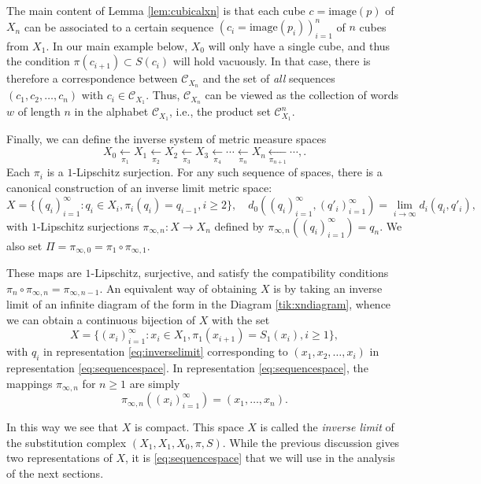 \documentclass{amsart}
\theoremstyle{plain}
\theoremstyle{definition}
\numberwithin{equation}{section}
\numberwithin{theorem}{section}
\newcommand{\cC}{\mathcal{C}}
\begin{document}
The main content of Lemma \ref{lem:cubicalxn} is that each cube $c=\text{image}(p)$ of $X_n$ can be associated to a certain sequence $(c_i=\text{image}(p_i))_{i=1}^n$ of  $n$ cubes from $X_1$. In our main example below, $X_0$ will only have a single cube, and thus the condition $\pi(c_{i+1})\subset S(c_i)$ will hold vacuously. In that case, there is therefore a correspondence between  $\cC_{X_n}$ and the set of \emph{all} sequences $(c_1,c_2,\dots, c_n)$ with $c_i\in \cC_{X_1}$. Thus, $\cC_{X_n}$ can be viewed as the collection of words $w$ of length $n$ in the alphabet $\cC_{X_1}$, i.e., the product set $\cC_{X_1}^n$. 

Finally, we can  define the inverse system of metric measure spaces
\[
X_0 \xleftarrow[\pi_1]{} X_1 \xleftarrow[\pi_2]{} X_2 \xleftarrow[\pi_3]{} X_3 \xleftarrow[\pi_4]{} \cdots \xleftarrow[\pi_n]{} X_n \xleftarrow[\pi_{n+1}]{} \cdots,
.\]
Each $\pi_i$ is a $1$-Lipschitz surjection. For any such sequence of spaces, there is a canonical construction of an inverse limit metric space:
\begin{equation}\label{eq:inverselimit}
X = \{(q_i)_{i=1}^\infty : q_i\in X_i, \pi_i(q_i)=q_{i-1}, i\geq 2\}, \quad d_0((q_i)_{i=1}^\infty,  (q'_i)_{i=1}^\infty)=\lim_{i\to\infty} d_i(q_i,q'_i),
\end{equation}
with $1$-Lipschitz surjections $\pi_{\infty,n}:X\to X_n$ defined by  $\pi_{\infty,n}((q_i)_{i=1}^\infty)=q_n$. We also set $\Pi = \pi_{\infty,0} = \pi_1 \circ \pi_{\infty, 1}.$


These maps are $1$-Lipschitz, surjective, and satisfy the compatibility conditions $\pi_{n} \circ \pi_{\infty,n}=\pi_{\infty,n-1}$. An equivalent way of obtaining $X$ is by taking an inverse limit of an infinite diagram of the form in the Diagram \ref{tik:xndiagram}, whence we can obtain a continuous bijection of $X$ with the set
\begin{equation}\label{eq:sequencespace}
X = \{(x_i)_{i=1}^\infty : x_i\in X_1, \pi_1(x_{i+1})=S_1(x_{i}), i\geq 1\},
\end{equation}
with $q_i$ in representation \eqref{eq:inverselimit} corresponding to $(x_1, x_2, \dots, x_i)$ in representation \eqref{eq:sequencespace}. In representation \eqref{eq:sequencespace}, the mappings $\pi_{\infty,n}$ for $n\geq 1$ are simply
$$ \pi_{\infty,n}((x_i)_{i=1}^\infty) = (x_1, \dots, x_n).$$

In this way we see that $X$ is compact. This space $X$ is called the \emph{inverse limit} of the substitution complex $(X_1,X_1,X_0,\pi,S)$. While the previous discussion gives two representations of $X$, it is \eqref{eq:sequencespace} that we will use in the analysis of the next sections. 
\end{document}
